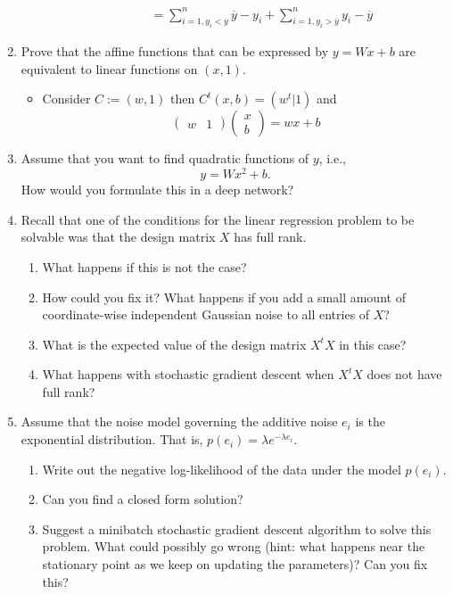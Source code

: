 \documentclass{article}
\begin{document}
\begin{enumerate}[label=\arabic*.]
\begin{enumerate}[label=\arabic*.]
\begin{itemize}
\begin{align*}
				&= \sum_{i = 1, y_i < \overline{y}}^n \overline{y} - y_i + \sum_{i = 1, y_i > \overline{y}}^n y_i - \overline{y}
				\end{align*}
			\end{itemize}
	\end{enumerate}
\item Prove that the affine functions that can be expressed by $y = Wx + b$ are equivalent to linear functions on $(x, 1)$.
	\begin{itemize}
		\item Consider $C := (w, 1)$ then $C^t(x, b) = (w^t|1)$ and
		$$
		\begin{pmatrix}
		w & 1
		\end{pmatrix}
		\begin{pmatrix}
		x \\ b
		\end{pmatrix} = 
		wx + b
		$$
	\end{itemize}
\item Assume that you want to find quadratic functions of $y$, i.e.,
	$$
	y = Wx^2 + b.
	$$
	How would you formulate this in a deep network?
\item Recall that one of the conditions for the linear regression problem to be solvable was that the design matrix $X$ has full rank.
	\begin{enumerate}[label=\arabic*.]
	\item What happens if this is not the case?
	\item How could you fix it? What happens if you add a small amount of coordinate-wise independent Gaussian noise to all entries of $X$?
	\item What is the expected value of the design matrix $X^tX$ in this case?
	\item What happens with stochastic gradient descent when $X^tX$ does not have full rank?
	\end{enumerate}
\item Assume that the noise model governing the additive noise $e_i$ is the exponential distribution. That is, $p(e_i) = \lambda e^{-\lambda e_i}$.
	\begin{enumerate}[label=\arabic*.]
	\item Write out the negative log-likelihood of the data under the model $p(e_i)$.
	\item Can you find a closed form solution?
	\item Suggest a minibatch stochastic gradient descent algorithm to solve this problem. What could possibly go wrong (hint: what happens near the stationary point as we keep on updating the parameters)? Can you fix this?

\end{enumerate}
\end{enumerate}
\end{document}
